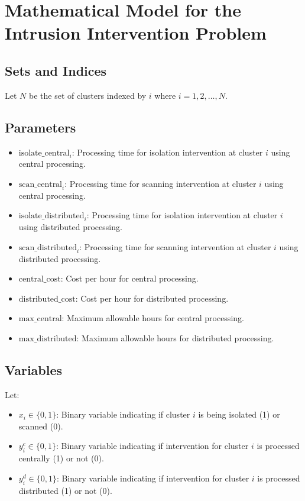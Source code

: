 \documentclass{article}
\begin{document}
\section*{Mathematical Model for the Intrusion Intervention Problem}

\subsection*{Sets and Indices}
Let \( N \) be the set of clusters indexed by \( i \) where \( i = 1, 2, \ldots, N \).

\subsection*{Parameters}
\begin{itemize}
    \item \( \text{isolate\_central}_{i} \): Processing time for isolation intervention at cluster \( i \) using central processing.
    \item \( \text{scan\_central}_{i} \): Processing time for scanning intervention at cluster \( i \) using central processing.
    \item \( \text{isolate\_distributed}_{i} \): Processing time for isolation intervention at cluster \( i \) using distributed processing.
    \item \( \text{scan\_distributed}_{i} \): Processing time for scanning intervention at cluster \( i \) using distributed processing.
    \item \( \text{central\_cost} \): Cost per hour for central processing.
    \item \( \text{distributed\_cost} \): Cost per hour for distributed processing.
    \item \( \text{max\_central} \): Maximum allowable hours for central processing.
    \item \( \text{max\_distributed} \): Maximum allowable hours for distributed processing.
\end{itemize}

\subsection*{Variables}
Let:
\begin{itemize}
    \item \( x_{i} \in \{0, 1\} \): Binary variable indicating if cluster \( i \) is being isolated (1) or scanned (0).
    \item \( y_{i}^{c} \in \{0, 1\} \): Binary variable indicating if intervention for cluster \( i \) is processed centrally (1) or not (0).
    \item \( y_{i}^{d} \in \{0, 1\} \): Binary variable indicating if intervention for cluster \( i \) is processed distributed (1) or not (0).
\end{itemize}
\end{document}
